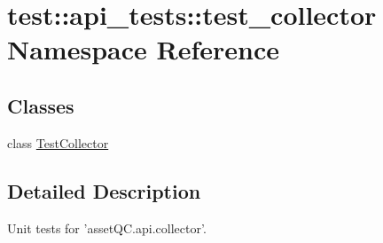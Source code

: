 \hypertarget{namespacetest_1_1api__tests_1_1test__collector}{\section{test\-:\-:api\-\_\-tests\-:\-:test\-\_\-collector \-Namespace \-Reference}
\label{da/d39/namespacetest_1_1api__tests_1_1test__collector}
}
\subsection*{\-Classes}
\begin{DoxyCompactItemize}
\item 
class \hyperlink{classtest_1_1api__tests_1_1test__collector_1_1TestCollector}{\-Test\-Collector}
\end{DoxyCompactItemize}


\subsection{\-Detailed \-Description}
\begin{DoxyVerb}
Unit tests for 'assetQC.api.collector'.
\end{DoxyVerb}
 